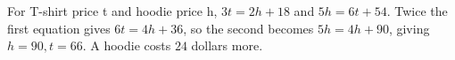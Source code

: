 For T-shirt price t and hoodie price h, $3t=2h+18$ and $5h=6t+54$. Twice the first equation gives $6t=4h+36$, so the second becomes $5h=4h+90$, giving $h=90,t=66$. A hoodie costs $\boxed{24}$ dollars more.

